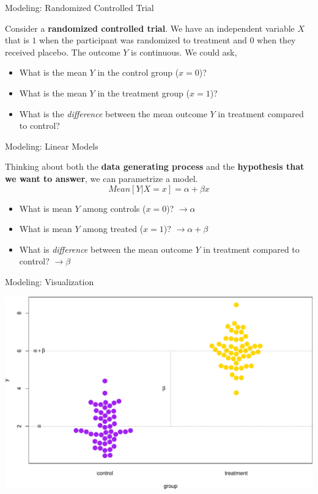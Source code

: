 \documentclass[ignorenonframetext,]{beamer}
\providecommand{\tightlist}{%
  \setlength{\itemsep}{0pt}\setlength{\parskip}{0pt}}
\begin{document}
\begin{frame}{Modeling: Randomized Controlled Trial}
\protect\hypertarget{modeling-randomized-controlled-trial}{}

Consider a \textbf{randomized controlled trial}. We have an independent
variable \(X\) that is \(1\) when the participant was randomized to
treatment and \(0\) when they received placebo. The outcome \(Y\) is
continuous. We could ask,

\begin{itemize}
\tightlist
\item
  What is the mean \(Y\) in the control group (\(x = 0\))?
\item
  What is the mean \(Y\) in the treatment group (\(x = 1\))?
\item
  What is the \emph{difference} between the mean outcome \(Y\) in
  treatment compared to control?
\end{itemize}

\end{frame}

\begin{frame}{Modeling: Linear Models}
\protect\hypertarget{modeling-linear-models-1}{}

Thinking about both the \textbf{data generating process} and the
\textbf{hypothesis that we want to answer}, we can parametrize a model.
\[
Mean[Y|X=x] = \alpha + \beta x
\]

\begin{itemize}
\tightlist
\item
  What is mean \(Y\) among controls (\(x = 0\))? \(\to \alpha\)
\item
  What is mean \(Y\) among treated (\(x = 1\))? \(\to \alpha + \beta\)
\item
  What is \emph{difference} between the mean outcome \(Y\) in treatment
  compared to control? \(\to \beta\)
\end{itemize}

\end{frame}

\begin{frame}{Modeling: Visualization}
\protect\hypertarget{modeling-visualization}{}

\includegraphics{biostats_I_files/figure-beamer/unnamed-chunk-2-1.pdf}

\end{frame}
\end{document}
